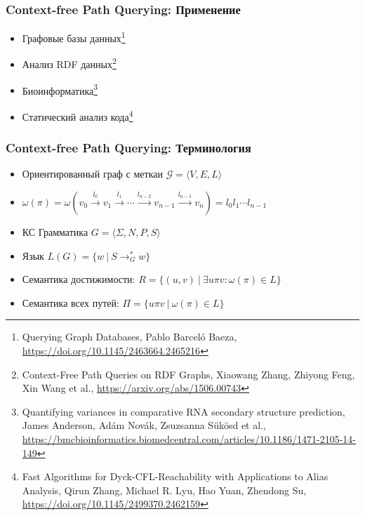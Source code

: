 \documentclass[xcolor=table,english]{beamer}
\begin{document}
\begin{frame}[fragile] \frametitle{Context-free Path Querying: Применение}
    \begin{itemize}
        \item Графовые базы данных\footnote{Querying Graph Databases, Pablo Barceló Baeza,  \href{https://doi.org/10.1145/2463664.2465216}{https://doi.org/10.1145/2463664.2465216}}
        \item Анализ RDF данных\footnote{Context-Free Path Queries on RDF Graphs, Xiaowang Zhang, Zhiyong Feng, Xin Wang et al., \href{https://arxiv.org/abs/1506.00743}{https://arxiv.org/abs/1506.00743}}
        \item Биоинформатика\footnote{Quantifying variances in comparative RNA secondary structure prediction, James Anderson, Adám Novák, Zsuzsanna Sükösd et al., \href{https://bmcbioinformatics.biomedcentral.com/articles/10.1186/1471-2105-14-149}{https://bmcbioinformatics.biomedcentral.com/articles/10.1186/1471-2105-14-149}}
        \item Статический анализ кода\footnote{Fast Algorithms for Dyck-CFL-Reachability with Applications to Alias Analysis, Qirun Zhang, Michael R. Lyu, Hao Yuan, Zhendong Su, \href{https://doi.org/10.1145/2499370.2462159}{https://doi.org/10.1145/2499370.2462159}}
    \end{itemize}
\end{frame}

\begin{frame}[fragile] \frametitle{Context-free Path Querying: Терминология}
    \begin{itemize}
        \item Ориентированный граф с меткаи $\mathcal{G} = \langle V, E, L \rangle$
        \item $\omega(\pi) = \omega(v_0 \xrightarrow{l_0} v_1 \xrightarrow{l_1} \cdots \xrightarrow{l_{n-2}} v_{n-1} \xrightarrow{l_{n-1}} v_n) = l_0 l_1 \cdots l_{n-1}$
        \item КС Грамматика $G = \langle \Sigma, N, P, S \rangle$
        \item Язык $L(G) = \{ w~|~S \rightarrow^*_G w \}$
        \item Семантика достижимости: $R = \{ (u, v) ~|~ \exists u \pi v: \omega(\pi) \in L \}$
        \item Семантика всех путей: $\Pi = \{ u \pi v ~|~ \omega(\pi) \in L \}$
    \end{itemize}
\end{frame}
\end{document}
